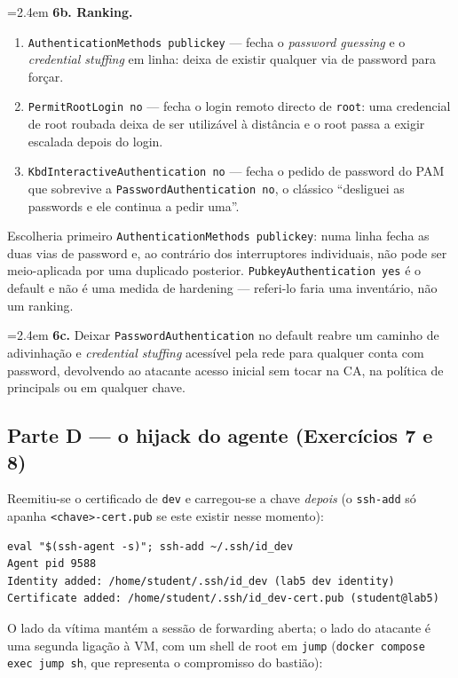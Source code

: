 \documentclass[a4paper,11pt]{article}
\newenvironment{answer}[1]{%
  \par\addvspace{7pt}\noindent
  \hangindent=2.4em\hangafter=1
  {\color{sscnblue}\bfseries #1\hspace{0.55em}}\ignorespaces}
  {\par\addvspace{5pt}}
\newcommand{\cmd}[1]{\textcolor{sscnblue}{\texttt{#1}}}
\begin{document}
\begin{answer}{6b. Ranking.}
\begin{enumerate}
  \item \cmd{AuthenticationMethods publickey} --- fecha o \emph{password guessing} e o
    \emph{credential stuffing} em linha: deixa de existir qualquer via de password para
    for\c{c}ar.
  \item \cmd{PermitRootLogin no} --- fecha o login remoto directo de \cmd{root}: uma
    credencial de root roubada deixa de ser utiliz\'avel \`a dist\^ancia e o root passa a
    exigir escalada depois do login.
  \item \cmd{KbdInteractiveAuthentication no} --- fecha o pedido de password do PAM que
    sobrevive a \cmd{PasswordAuthentication no}, o cl\'assico ``desliguei as passwords e
    ele continua a pedir uma''.
\end{enumerate}
Escolheria primeiro \cmd{AuthenticationMethods publickey}: numa linha fecha as duas vias
de password e, ao contr\'ario dos interruptores individuais, n\~ao pode ser meio-aplicada
por uma duplicado posterior. \cmd{PubkeyAuthentication yes} \'e o default e n\~ao \'e uma
medida de hardening --- referi-lo faria uma invent\'ario, n\~ao um ranking.
\end{answer}

\begin{answer}{6c.}
Deixar \cmd{PasswordAuthentication} no default reabre um caminho de adivinha\c{c}\~ao e
\emph{credential stuffing} acess\'ivel pela rede para qualquer conta com password, devolvendo
ao atacante acesso inicial sem tocar na CA, na pol\'itica de principals ou em qualquer
chave.
\end{answer}

\subsection{Parte D --- o hijack do agente (Exerc\'icios 7 e 8)}

Reemitiu-se o certificado de \cmd{dev} e carregou-se a chave \emph{depois} (o
\cmd{ssh-add} s\'o apanha \cmd{<chave>-cert.pub} se este existir nesse momento):

\begin{lstlisting}
eval "$(ssh-agent -s)"; ssh-add ~/.ssh/id_dev
Agent pid 9588
Identity added: /home/student/.ssh/id_dev (lab5 dev identity)
Certificate added: /home/student/.ssh/id_dev-cert.pub (student@lab5)
\end{lstlisting}

O lado da v\'itima mant\'em a sess\~ao de forwarding aberta; o lado do atacante \'e uma
segunda liga\c{c}\~ao \`a VM, com um shell de root em \cmd{jump}
(\cmd{docker compose exec jump sh}, que representa o compromisso do basti\~ao):
\end{document}
